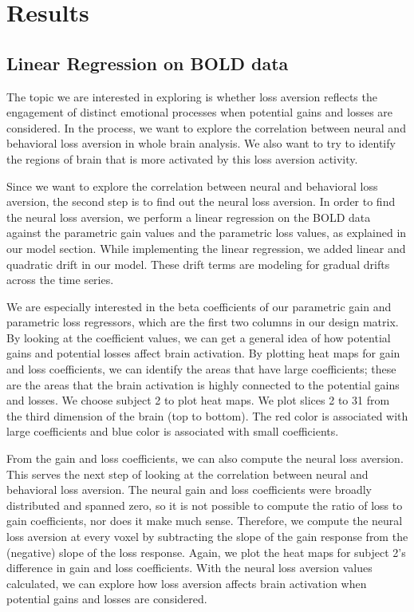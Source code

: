 \section{Results}

\subsection{Linear Regression on BOLD data}

The topic we are interested in exploring is whether loss aversion reflects 
the engagement of distinct emotional processes when potential gains and 
losses are considered. In the process, we want to explore the correlation 
between neural and behavioral loss aversion in whole brain analysis. We also 
want to try to identify the regions of brain that is more activated by this 
loss aversion activity.

Since we want to explore the correlation between neural and behavioral loss 
aversion, the second step is to find out the neural loss aversion. In order 
to find the neural loss aversion, we perform a linear regression on the BOLD 
data against the parametric gain values and the parametric loss values, as 
explained in our model section. While implementing the linear regression, we 
added linear and quadratic drift in our model. These drift terms are modeling 
for gradual drifts across the time series.

We are especially interested in the beta coefficients of our parametric gain 
and parametric loss regressors, which are the first two columns in our design 
matrix. By looking at the coefficient values, we can get a general idea of 
how potential gains and potential losses affect brain activation. By plotting 
heat maps for gain and loss coefficients, we can identify the areas that have 
large coefficients; these are the areas that the brain activation is highly 
connected to the potential gains and losses. We choose subject 2 to plot heat 
maps. We plot slices 2 to 31 from the third dimension of the brain (top to 
bottom). The red color is associated with large coefficients and blue color 
is associated with small coefficients.

From the gain and loss coefficients, we can also compute the neural loss 
aversion. This serves the next step of looking at the correlation between 
neural and behavioral loss aversion. The neural gain and loss coefficients 
were broadly distributed and spanned zero, so it is not possible to compute 
the ratio of loss to gain coefficients, nor does it make much sense. 
Therefore, we compute the neural loss aversion at every voxel by subtracting 
the slope of the gain response from the (negative) slope of the loss response. 
Again, we plot the heat maps for subject 2’s difference in gain and loss 
coefficients. With the neural loss aversion values calculated, we can explore 
how loss aversion affects brain activation when potential gains and losses are 
considered.

